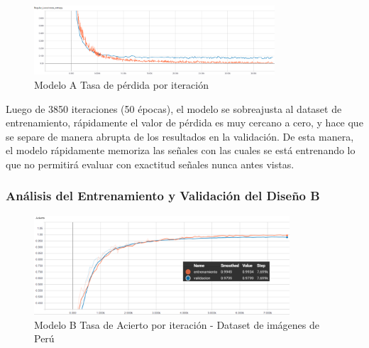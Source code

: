 			\begin{figure}[H]
				\begin{center}
				\includegraphics[width=0.8\textwidth]{images/desarrollo/trainResults/peru/model0Loss} 
				\end{center}
				\begin{center}
				\caption{\small{Modelo A Tasa de pérdida por iteración}}
				
				{\small{\fontsize{10}{16.8}\selectfont {Fuente: Elaboración propia}}}
				\end{center}
				\vspace{-1.5em}
			\end{figure}

			Luego de 3850 iteraciones (50 épocas), el modelo se sobreajusta al dataset de entrenamiento, rápidamente el valor de pérdida es muy cercano a cero, y hace que se separe de manera abrupta de los resultados en la validación. De esta manera, el modelo rápidamente memoriza las señales con las cuales se está entrenando lo que no permitirá evaluar con exactitud señales nunca antes vistas.


		\subsubsection{Análisis del Entrenamiento y Validación del Diseño B}  
		
			\begin{figure}[H]
				\begin{center}
				\includegraphics[width=0.85\textwidth]{images/desarrollo/trainResults/peru/modelBAcierto} 
				\end{center}
				\begin{center}
				\caption{\small{Modelo B Tasa de Acierto por iteración - Dataset de imágenes de Perú  }}
				
				{\small{\fontsize{10}{16.8}\selectfont {Fuente: Elaboración propia}}}
				\end{center}
				\vspace{-1.5em}
			\end{figure}
		

